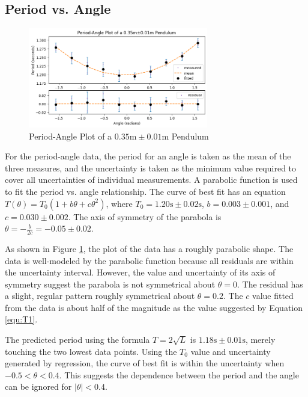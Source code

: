 \documentclass[12pt]{article}
\begin{document}
\subsection{Period vs. Angle} \label{section:period-angle}

\begin{figure}[!ht]
\begin{center}
\includegraphics[width=0.7\textwidth]{period-angle.png}
\end{center}
\caption{Period-Angle Plot of a $0.35\mathrm{m}\pm0.01\mathrm{m}$ Pendulum}
\label{fig:period-angle}
\end{figure}

For the period-angle data, the period for an angle is taken as the mean of the three measures, and the uncertainty is taken as the minimum value required to cover all uncertainties of individual measurements. A parabolic function is used to fit the period vs. angle relationship. The curve of best fit has an equation $T(\theta)=T_0\left(1+b\theta+c\theta^2\right)$, where $T_0=1.20\mathrm{s}\pm0.02\mathrm{s}$, $b=0.003\pm0.001$, and $c=0.030\pm0.002$. The axis of symmetry of the parabola is $\theta=-\frac{b}{2c}=-0.05\pm0.02$.

As shown in Figure \ref{fig:period-angle}, the plot of the data has a roughly parabolic shape. The data is well-modeled by the parabolic function because all residuals are within the uncertainty interval. However, the value and uncertainty of its axis of symmetry suggest the parabola is not symmetrical about $\theta=0$. The residual has a slight, regular pattern roughly symmetrical about $\theta=0.2$. The $c$ value fitted from the data is about half of the magnitude as the value suggested by Equation \ref{equ:T1}.

The predicted period using the formula $T=2\sqrt{L}$ is $1.18\mathrm{s}\pm0.01\mathrm{s}$, merely touching the two lowest data points. Using the $T_0$ value and uncertainty generated by regression, the curve of best fit is within the uncertainty when $-0.5<\theta<0.4$. This suggests the dependence between the period and the angle can be ignored for $|\theta|<0.4$.
\end{document}
